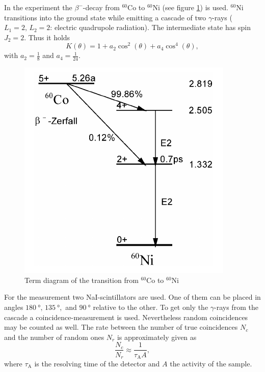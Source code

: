 In the experiment the $\beta^{-}$-decay from $^{60}$Co to $^{60}$Ni (see figure \ref{fig:term}) is used. $^{60}$Ni transitions into the ground state while emitting a cascade of two $\gamma$-rays ($L_{1}=2,\,L_{2}=2$: electric quadrupole radiation). The intermediate state has spin $J_{2}=2$. Thus it holds
\begin{equation}
 K(\theta) = 1 + a_{2}\cos^{2}(\theta) + a_{4}\cos^{4}(\theta),
\end{equation}
with $a_{2}=\frac{1}{8}$ and $a_{4}=\frac{1}{24}$. \cite{BB}

\begin{figure}[tb]
 \centering
 \includegraphics[scale=0.8]{./fig/termschema.png}
 \caption{Term diagram of the transition from $^{60}$Co to $^{60}$Ni \cite{BB}}
 \label{fig:term}
\end{figure}

For the measurement two NaI-scintillators are used. One of them can be placed in angles $\SI{180}{\degree},\,\SI{135}{\degree},$ and $\SI{90}{\degree}$ relative to the other. To get only the $\gamma$-rays from the cascade a coincidence-measurement is used. Nevertheless random coincidences may be counted as well. The rate between the number of true coincidences $N_{c}$ and the number of random ones $N_{r}$ is approximately given as
\begin{equation}
 \frac{N_{c}}{N_{r}} \approx \frac{1}{\tau_{\textrm{A}}A},
\end{equation}
where $\tau_{\textrm{A}}$ is the resolving time of the detector and $A$ the activity of the sample.



